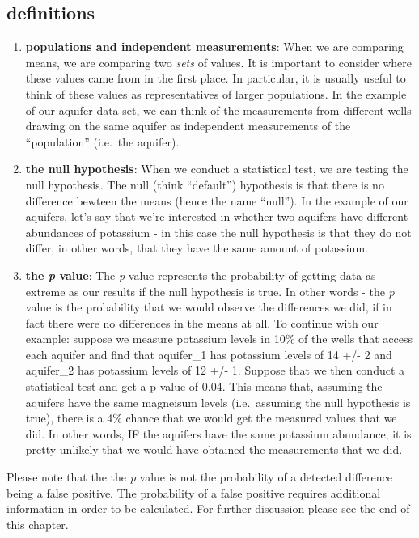 \documentclass[
]{krantz}
\begin{document}
\hypertarget{definitions}{%
\subsection{definitions}\label{definitions}}

\begin{enumerate}
\def\labelenumi{\arabic{enumi}.}
\item
  \textbf{populations and independent measurements}: When we are comparing means, we are comparing two \emph{sets} of values. It is important to consider where these values came from in the first place. In particular, it is usually useful to think of these values as representatives of larger populations. In the example of our aquifer data set, we can think of the measurements from different wells drawing on the same aquifer as independent measurements of the ``population'' (i.e.~the aquifer).
\item
  \textbf{the null hypothesis}: When we conduct a statistical test, we are testing the null hypothesis. The null (think ``default'') hypothesis is that there is no difference bewteen the means (hence the name ``null''). In the example of our aquifers, let's say that we're interested in whether two aquifers have different abundances of potassium - in this case the null hypothesis is that they do not differ, in other words, that they have the same amount of potassium.
\item
  \textbf{the \emph{p} value}: The \emph{p} value represents the probability of getting data as extreme as our results if the null hypothesis is true. In other words - the \emph{p} value is the probability that we would observe the differences we did, if in fact there were no differences in the means at all. To continue with our example: suppose we measure potassium levels in 10\% of the wells that access each aquifer and find that aquifer\_1 has potassium levels of 14 +/- 2 and aquifer\_2 has potassium levels of 12 +/- 1. Suppose that we then conduct a statistical test and get a p value of 0.04. This means that, assuming the aquifers have the same magneisum levels (i.e.~assuming the null hypothesis is true), there is a 4\% chance that we would get the measured values that we did. In other words, IF the aquifers have the same potassium abundance, it is pretty unlikely that we would have obtained the measurements that we did.
\end{enumerate}

Please note that the the \emph{p} value is not the probability of a detected difference being a false positive. The probability of a false positive requires additional information in order to be calculated. For further discussion please see the end of this chapter.
\end{document}
